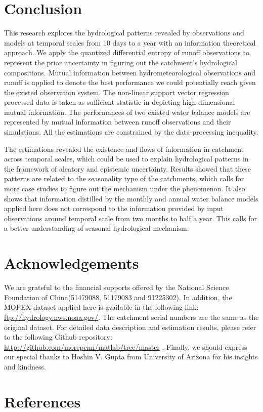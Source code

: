 \documentclass[review]{elsarticle}
\begin{document}
\section{Conclusion}
This research explores the hydrological patterns revealed by observations and models at temporal scales from 10 days to a year with an information theoretical approach. We apply the quantized differential entropy of runoff observations to represent the prior uncertainty in figuring out the catchment's hydrological compositions. Mutual information between hydrometeorological observations and runoff is applied to denote the best performance we could potentially reach given the existed observation system. The non-linear support vector regression processed data is taken as sufficient statistic in depicting  high dimensional mutual information.
The performances of two existed water balance models are represented by mutual information between runoff observations and their simulations. All the estimations are constrained by the  data-processing inequality. 

The estimations revealed the existence and flows of information in catchment across temporal scales, which could be used to explain hydrological patterns in the framework of aleatory and epistemic uncertainty. Results showed that these patterns are related to the seasonality type of the catchments, which calls for more case studies to figure out the mechanism under the phenomenon. It also shows that information distilled by the monthly and annual water balance models applied here does not correspond to the information provided by input observations around temporal scale from two months to half a year. This calls for a better understanding of seasonal hydrological mechanism.   

\section{Acknowledgements} 
We are grateful to the financial supports offered by the National Science Foundation of China(51479088, 51179083 and 91225302). In addition, the MOPEX dataset applied here is available in the following link:  \underline{ftp://hydrology.nws.noaa.gov/}. The catchment serial numbers are the same as the original dataset. For detailed data description and estimation results, please refer to the following Github repository: \underline{http://github.com/morepenn/matlab/tree/master} . Finally, we should express our special thanks to Hoshin V. Gupta from University of Arizona for his insights and kindness. 
 


\section*{References}


\end{document}
